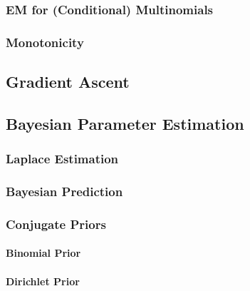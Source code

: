             \subsubsection{EM for (Conditional) Multinomials} %

            \subsubsection{Monotonicity} %

        \subsection{Gradient Ascent} %

        \subsection{Bayesian Parameter Estimation} %

            \subsubsection{Laplace Estimation} %

            \subsubsection{Bayesian Prediction} %

            \subsubsection{Conjugate Priors} %

                \paragraph{Binomial Prior} %

                \paragraph{Dirichlet Prior} %


